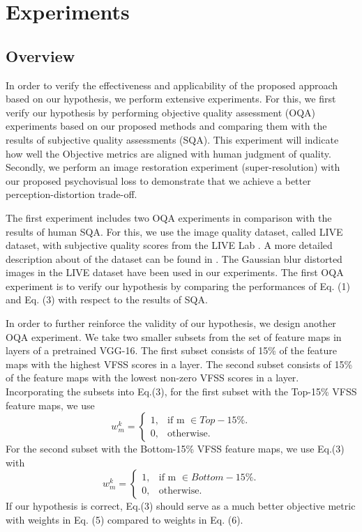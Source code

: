 \documentclass[10pt,twocolumn,letterpaper]{article}
\begin{document}
\section{Experiments}
\subsection{Overview}
In order to verify the effectiveness and applicability of the proposed approach based on our hypothesis, we perform extensive experiments. For this, we first verify our hypothesis by performing objective quality assessment (OQA) experiments based on our proposed methods and comparing them with the results of subjective quality assessments (SQA). This experiment will indicate how well the Objective metrics are aligned with human judgment of quality. Secondly, we perform an image restoration experiment (super-resolution) with our proposed psychovisual loss to demonstrate that we achieve a better perception-distortion trade-off. 

The first experiment includes two OQA experiments in comparison with the results of human SQA. For this, we use the image quality dataset, called LIVE dataset, with subjective quality scores from the LIVE Lab \cite{4}. A more detailed description about of the dataset can be found in \cite{4}. The Gaussian blur distorted images in the LIVE dataset have been used in our experiments. The first OQA experiment is to verify our hypothesis by comparing the performances of Eq. (1) and Eq. (3) with respect to the results of SQA. 
   
In order to further reinforce the validity of our hypothesis, we design another OQA experiment. We take two smaller subsets from the set of feature maps in layers of a pretrained VGG-16. The first subset consists of 15\% of the feature maps with the highest VFSS scores in a layer. The second subset consists of 15\% of the feature maps with the lowest non-zero VFSS scores in a layer. Incorporating the subsets into Eq.(3), for the first subset with the Top-15\% VFSS feature maps, we use 
\begin{equation}
  w_m^k=\begin{cases}
    1, & \text{if m $\in Top-15\%$}.\\
    0, & \text{otherwise}.
  \end{cases}
\end{equation}
For the second subset with the Bottom-15\% VFSS feature maps, we use Eq.(3) with
\begin{equation}
  w_m^k=\begin{cases}
    1, & \text{if m $\in Bottom-15\%$}.\\
    0, & \text{otherwise}.
  \end{cases}
\end{equation}
If our hypothesis is correct, Eq.(3) should serve as a much better objective metric with weights in Eq. (5) compared to weights in Eq. (6).
   
\end{document}

